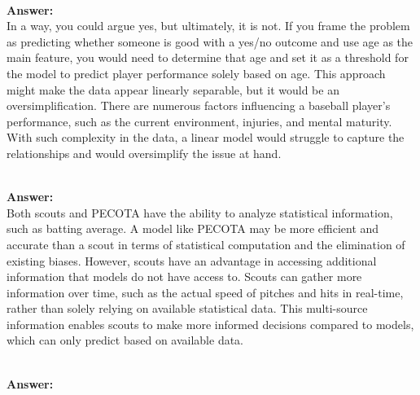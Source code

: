 \documentclass[12pt]{article}
\begin{document}
\begin{enumerate}
 \\ 
\textbf{Answer: } \\ 
In a way, you could argue yes, but ultimately, it is not. If you frame the problem as predicting whether someone is good with a yes/no outcome and use age as the main feature, you would need to determine that age and set it as a threshold for the model to predict player performance solely based on age. This approach might make the data appear linearly separable, but it would be an oversimplification. There are numerous factors influencing a baseball player's performance, such as the current environment, injuries, and mental maturity. With such complexity in the data, a linear model would struggle to capture the relationships and would oversimplify the issue at hand.


 \\ 
\textbf{Answer: } \\ 
Both scouts and PECOTA have the ability to analyze statistical information, such as batting average. A model like PECOTA may be more efficient and accurate than a scout in terms of statistical computation and the elimination of existing biases. However, scouts have an advantage in accessing additional information that models do not have access to. Scouts can gather more information over time, such as the actual speed of pitches and hits in real-time, rather than solely relying on available statistical data. This multi-source information enables scouts to make more informed decisions compared to models, which can only predict based on available data.

 \\ 
\textbf{Answer: } \\ 


\end{enumerate}
\end{document}
